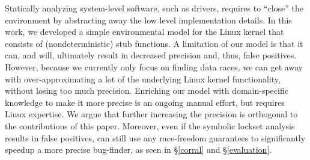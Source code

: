 Statically analyzing system-level software, such as drivers, requires to ``close'' the environment by abstracting away the low level implementation details. In this work, we developed a simple environmental model for the Linux kernel that consists of (nondeterministic) stub functions. A limitation of our model is that it can, and will, ultimately result in decreased precision and, thus, false positives. However, because we currently only focus on finding data races, we can get away with over-approximating a lot of the underlying Linux kernel functionality, without losing too much precision. Enriching our model with domain-specific knowledge to make it more precise is an ongoing manual effort, but requires Linux expertise. We argue that further increasing the precision is orthogonal to the contributions of this paper. Moreover, even if the symbolic lockset analysis results in false positives, \whoop can still use any race-freedom guarantees to significantly speedup a more precise bug-finder, as seen in \S\ref{corral} and \S\ref{evaluation}.
